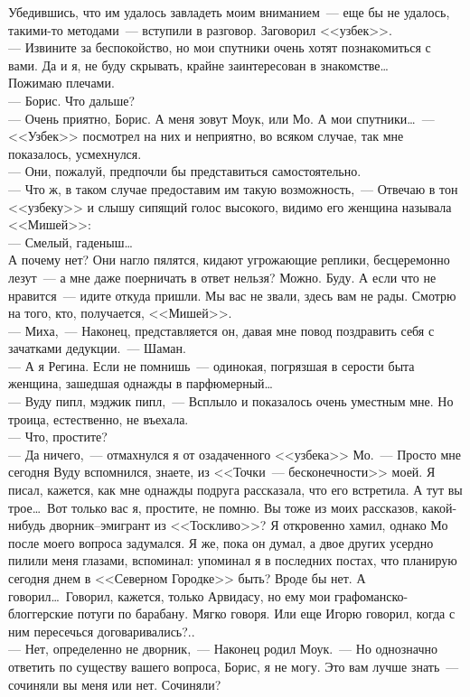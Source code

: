 Убедившись, что им удалось завладеть моим вниманием~--- еще бы не удалось, 
такими-то методами~--- вступили в разговор. Заговорил <<узбек>>.\\
--- Извините за беспокойство, но мои спутники очень хотят познакомиться с вами. 
Да и я, не буду скрывать, крайне заинтересован в знакомстве\ldots\\
Пожимаю плечами.\\
--- Борис. Что дальше?\\
--- Очень приятно, Борис. А меня зовут Моук, или Мо. А мои спутники\ldots~--- 
<<Узбек>> посмотрел на них и неприятно, во всяком случае, так мне показалось, усмехнулся.\\
--- Они, пожалуй, предпочли бы представиться самостоятельно.\\
--- Что ж, в таком случае предоставим им такую возможность,~--- Отвечаю в тон 
<<узбеку>> и слышу сипящий голос высокого, видимо его женщина называла 
<<Мишей>>:\\
--- Смелый, гаденыш\ldots\\
А почему нет? Они нагло пялятся, кидают угрожающие реплики, бесцеремонно лезут~--- 
а мне даже поерничать в ответ нельзя? Можно. Буду. А если что не нравится~--- 
идите откуда пришли. Мы вас не звали, здесь вам не рады. Смотрю на того, кто, 
получается, <<Мишей>>.\\
--- Миха,~--- Наконец, представляется он, давая мне повод поздравить себя с 
зачатками дедукции.~--- Шаман.\\
--- А я Регина. Если не помнишь~--- одинокая, погрязшая в серости быта женщина, 
зашедшая однажды в парфюмерный\ldots\\
--- Вуду пипл, мэджик пипл,~--- Всплыло и показалось очень уместным мне. Но 
троица, естественно, не въехала.\\
--- Что, простите? \\
--- Да ничего,~--- отмахнулся я от озадаченного <<узбека>> Мо.~--- Просто мне 
сегодня Вуду вспомнился, знаете, из <<Точки~--- бесконечности>> моей. Я писал, кажется, 
как мне однажды подруга рассказала, что его встретила. А тут вы трое\ldots\ Вот 
только 
вас я, простите, не помню. Вы тоже из моих рассказов, какой-нибудь 
дворник--эмигрант из <<Тоскливо>>? Я откровенно хамил, однако Мо после моего 
вопроса 
задумался. Я же, пока он думал, а двое других усердно пилили меня глазами, 
вспоминал: упоминал я в последних постах, что планирую сегодня днем в 
<<Северном 
Городке>> быть? Вроде бы нет. А говорил\ldots\ Говорил, кажется, только 
Арвидасу, но ему мои графоманско-блоггерские потуги по барабану. Мягко говоря. Или еще Игорю 
говорил, когда с ним пересечься договаривались?..\\
--- Нет, определенно не дворник,~--- Наконец родил Моук.~--- Но однозначно 
ответить по существу вашего вопроса, Борис, я не могу. Это вам лучше знать~--- сочиняли вы 
меня или нет. Сочиняли?

